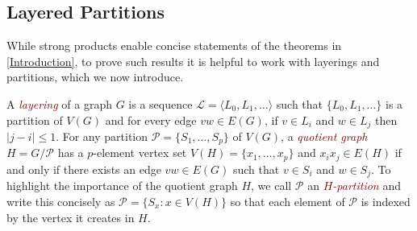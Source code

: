 \documentclass{patmorin}
\newcommand{\defin}[1]{\textcolor{Maroon}{\emph{#1}}}
\newcommand{\note}[2]{\noindent{\color{red}[#1:~#2]}}
\DeclareMathOperator{\tw}{tw}
\renewcommand{\SS}{\mathcal{S}}
\renewcommand{\geq}{\geqslant}
\renewcommand{\leq}{\leqslant}
\begin{document}
%
%
%
%


\subsection{Layered Partitions}
\label{LayeredPartitions}

While strong products enable concise statements of the theorems in \cref{Introduction}, to prove such results it is helpful to work with layerings and partitions, which we now introduce.

A \defin{layering} of a graph $G$ is a sequence $\mathcal{L}=\langle L_0,L_1,\ldots\rangle$ such that $\{L_0,L_1,\ldots\}$ is a partition of $V(G)$ and for every edge $vw\in E(G)$, if $v\in L_i$ and $w\in L_j$ then $|j-i|\leq 1$.  For any partition $\mathcal{P}=\{S_1,\ldots,S_p\}$ of $V(G)$, a \defin{quotient graph} $H=G/\mathcal{P}$ has a $p$-element vertex set $V(H)=\{x_1,\ldots,x_p\}$ and $x_ix_j\in E(H)$ if and only if there exists an edge $vw\in E(G)$ such that $v\in S_i$ and $w\in S_j$. To highlight the importance of the quotient graph $H$, we call $\mathcal{P}$ an \defin{$H$-partition} and write this concisely as $\mathcal{P}=\{S_x : x\in V(H)\}$ so that each element of $\mathcal{P}$ is indexed by the vertex it creates in $H$.
\end{document}
